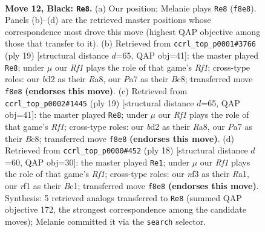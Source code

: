 \documentclass[11pt]{article}
\begin{document}
\clearpage

\begin{figure}[p]\centering
\begin{subfigure}{0.46\textwidth}\centering
\resizebox{\linewidth}{!}{%
\newchessgame
\chessboard[
  setfen={rnqb1rk1/pp1b1ppp/4pn2/2Pp4/N2P4/5N2/PP1BBPPP/2RQ1RK1 b - - 10 12},
  showmover=false,
  pgfstyle=straightmove, color=movearrow, markmove={f8-e8}
]}
\caption{}
\end{subfigure}\hfill
\begin{subfigure}{0.46\textwidth}\centering
\resizebox{\linewidth}{!}{%
\newchessgame
\chessboard[
  setfen={r1bq1rk1/pp3pbp/n2p1np1/2pP4/4P3/2N5/PP1NBPPP/R1BQ1RK1 b - - 7 10},
  showmover=false,
  pgfstyle=straightmove, color=movearrow, markmove={f8-e8}
]}
\caption{}
\end{subfigure}
\\[4pt]
\begin{subfigure}{0.46\textwidth}\centering
\resizebox{\linewidth}{!}{%
\newchessgame
\chessboard[
  setfen={r1bq1rk1/pp3pbp/n2p1np1/2pP4/4P3/2N5/PP1NBPPP/R1BQ1RK1 b - - 4 10},
  showmover=false,
  pgfstyle=straightmove, color=movearrow, markmove={f8-e8}
]}
\caption{}
\end{subfigure}\hfill
\begin{subfigure}{0.46\textwidth}\centering
\resizebox{\linewidth}{!}{%
\newchessgame
\chessboard[
  setfen={r2q1rk1/pp1bbppp/2np1n2/1Bp5/P3P3/2N2N2/1PP2PPP/R1BQ1RK1 w - - 3 10},
  showmover=false,
  pgfstyle=straightmove, color=movearrow, markmove={f1-e1}
]}
\caption{}
\end{subfigure}
\caption{\textbf{Move 12, Black: \texttt{Re8}.} (a) Our position; Melanie plays \texttt{Re8} (\texttt{f8e8}). Panels (b)--(d) are the retrieved master positions whose correspondence most drove this move (highest QAP objective among those that transfer to it). (b) Retrieved from \texttt{ccrl\_top\_p0001\#3766} (ply 19) [structural distance $d$=65, QAP obj=41]: the master played \texttt{Re8}; under $\mu$ our \emph{Rf1} plays the role of that game's \emph{Rf1}; cross-type roles: our \emph{b}d2 as their \emph{R}a8, our \emph{P}a7 as their \emph{B}c8; transferred move \texttt{f8e8} \textbf{(endorses this move)}. (c) Retrieved from \texttt{ccrl\_top\_p0002\#1445} (ply 19) [structural distance $d$=65, QAP obj=41]: the master played \texttt{Re8}; under $\mu$ our \emph{Rf1} plays the role of that game's \emph{Rf1}; cross-type roles: our \emph{b}d2 as their \emph{R}a8, our \emph{P}a7 as their \emph{B}c8; transferred move \texttt{f8e8} \textbf{(endorses this move)}. (d) Retrieved from \texttt{ccrl\_top\_p0000\#452} (ply 18) [structural distance $d$=60, QAP obj=30]: the master played \texttt{Re1}; under $\mu$ our \emph{Rf1} plays the role of that game's \emph{Rf1}; cross-type roles: our \emph{n}f3 as their \emph{R}a1, our \emph{r}f1 as their \emph{B}c1; transferred move \texttt{f8e8} \textbf{(endorses this move)}. Synthesis: 5 retrieved analogs transferred to \texttt{Re8} (summed QAP objective 172, the strongest correspondence among the candidate moves); Melanie committed it via the \texttt{search} selector.}
\label{fig:thought-m23}
\end{figure}
\end{document}

